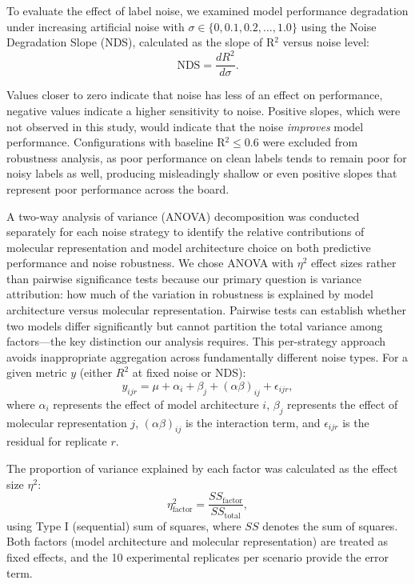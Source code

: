 \documentclass[pdflatex,sn-basic]{sn-jnl}%
\theoremstyle{thmstyleone}%
\theoremstyle{thmstyletwo}%
\theoremstyle{thmstylethree}%
\begin{document}
To evaluate the effect of label noise, we examined model performance degradation under increasing artificial noise with $\sigma \in \{0, 0.1, 0.2, \ldots, 1.0\}$ using the Noise Degradation Slope (NDS), calculated as the slope of R$^2$ versus noise level:
$$
\text{NDS} = \frac{dR^2}{d\sigma}.
$$

Values closer to zero indicate that noise has less of an effect on performance, negative values indicate a higher sensitivity to noise. Positive slopes, which were not observed in this study, would indicate that the noise \textit{improves} model performance. Configurations with baseline R$^2 \leq 0.6$ were excluded from robustness analysis, as poor performance on clean labels tends to remain poor for noisy labels as well, producing misleadingly shallow or even positive slopes that represent poor performance across the board.

A two-way analysis of variance (ANOVA) decomposition was conducted separately for each noise strategy to identify the relative contributions of molecular representation and model architecture choice on both predictive performance and noise robustness. We chose ANOVA with $\eta^2$ effect sizes rather than pairwise significance tests because our primary question is variance attribution: how much of the variation in robustness is explained by model architecture versus molecular representation. Pairwise tests can establish whether two models differ significantly but cannot partition the total variance among factors---the key distinction our analysis requires. This per-strategy approach avoids inappropriate aggregation across fundamentally different noise types. For a given metric $y$ (either $R^2$ at fixed noise or NDS):
$$
y_{ijr} = \mu + \alpha_i + \beta_j + (\alpha\beta)_{ij} + \epsilon_{ijr},
$$
where $\alpha_i$ represents the effect of model architecture $i$, $\beta_j$ represents the effect of molecular representation $j$, $(\alpha\beta)_{ij}$ is the interaction term, and $\epsilon_{ijr}$ is the residual for replicate $r$.

The proportion of variance explained by each factor was calculated as the effect size $\eta^2$:
$$
\eta^2_{\text{factor}} = \frac{SS_{\text{factor}}}{SS_{\text{total}}},
$$
using Type I (sequential) sum of squares, where $SS$ denotes the sum of squares. Both factors (model architecture and molecular representation) are treated as fixed effects, and the 10 experimental replicates per scenario provide the error term.
\end{document}
